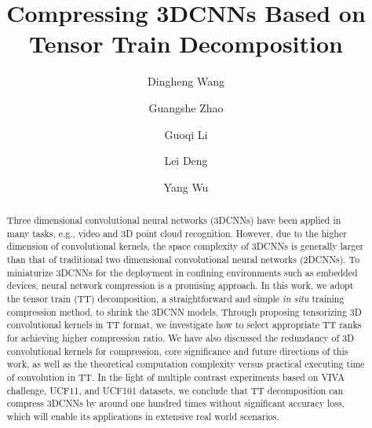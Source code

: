 \documentclass[a4paper,fleqn]{cas-dc}
\begin{document}
\let\WriteBookmarks\relax
\def\floatpagepagefraction{1}
\def\textpagefraction{.001}

\title [mode = title]{Compressing 3DCNNs Based on Tensor Train Decomposition}                      

\author[1]{Dingheng Wang}
\fnmark[1]
\address[1]{School of Electronic and Information Engineering, Xi'an Jiaotong University, Xi'an 710049, China}

\author[1]{Guangshe Zhao}
\fnmark[2]

\author[2]{Guoqi Li}
\cormark[1]
\fnmark[3]
\address[2]{Department of Precision Instrumentation, Center for Brain Inspired Computing Research and  Beijing Innovation Center for Future Chip, Tsinghua University, Beijing 100084, China}

\author[3]{Lei Deng}
\fnmark[4]
\address[3]{University of California, Santa Barbara, CA93106, USA}

\author[4]{Yang Wu}
\fnmark[5]
\address[4]{Institute for Research Initiatives, Nara Institute of Science and Technology, Takayama-cho, Ikoma, Nara, Japan}


\begin{abstract}
Three dimensional convolutional neural networks (3DCNNs) have been applied in many tasks, e.g., video and 3D point cloud recognition. However, due to the higher dimension of convolutional kernels, the space complexity of 3DCNNs is generally larger than that of traditional  two dimensional convolutional neural networks (2DCNNs). To miniaturize 3DCNNs for the deployment in confining environments such as embedded devices, neural network compression is a promising approach. In this work, we adopt the tensor train (TT) decomposition, a straightforward and simple \emph{in situ} training compression method, to shrink the 3DCNN models. Through proposing tensorizing 3D convolutional kernels in TT format, we investigate how to select appropriate TT ranks for achieving higher compression ratio. We have also discussed the redundancy of 3D convolutional kernels for compression, core significance and future directions of this work, as well as the theoretical computation complexity versus practical executing time of convolution in TT. In the light of multiple contrast experiments based on VIVA challenge, UCF11, and UCF101 datasets, we conclude that TT decomposition can compress 3DCNNs by around one hundred times without significant accuracy loss, which will enable its applications in extensive real world scenarios. 
\end{abstract}
\end{document}
